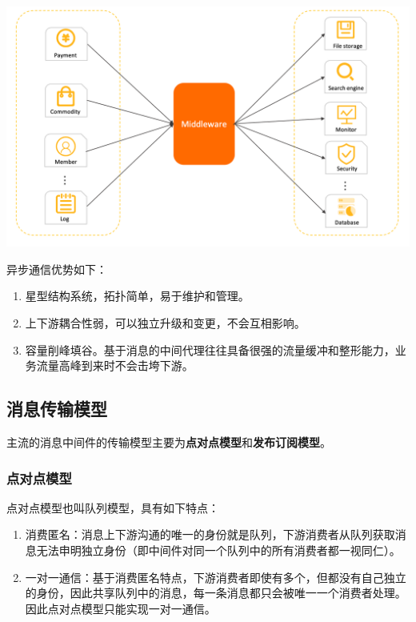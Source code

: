 \documentclass[11pt, a4paper, oneside, fontset=none]{ctexbook}
\begin{document}
\begin{center}
  \begin{minipage}{\textwidth}
    \center
    \includegraphics[width=\textwidth]{picture/异步通信模型.png}
    \captionsetup{hypcap=false}
    \label{fig:异步通信模型}
  \end{minipage}
\end{center}

异步通信优势如下：
\begin{enumerate}
  \item 星型结构系统，拓扑简单，易于维护和管理。
  \item 上下游耦合性弱，可以独立升级和变更，不会互相影响。
  \item 容量削峰填谷。基于消息的中间代理往往具备很强的流量缓冲和整形能力，业务流量高峰到来时不会击垮下游。
\end{enumerate}

\subsection{消息传输模型}
主流的消息中间件的传输模型主要为{\bfseries\kaishu 点对点模型}和{\bfseries\kaishu 发布订阅模型}。
\subsubsection{点对点模型}
点对点模型也叫队列模型，具有如下特点：
\begin{enumerate}
  \item 消费匿名：消息上下游沟通的唯一的身份就是队列，下游消费者从队列获取消息无法申明独立身份（即中间件对同一个队列中的所有消费者都一视同仁）。
  \item 一对一通信：基于消费匿名特点，下游消费者即使有多个，但都没有自己独立的身份，因此共享队列中的消息，每一条消息都只会被唯一一个消费者处理。因此点对点模型只能实现一对一通信。
\end{enumerate}
\end{document}
